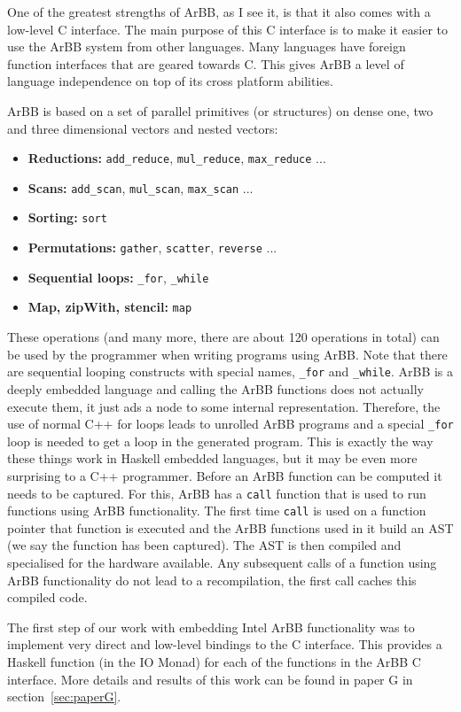 \documentclass[a4paper]{book}
\begin{document}
One of the greatest strengths of ArBB, as I see it, is that it also comes with a low-level C 
interface. The main purpose of this C interface is to make it easier to use the ArBB system 
from other languages. Many languages have foreign function interfaces that are geared towards C.
This gives ArBB a level of language independence on top of its cross platform abilities.  


ArBB is based on a set of parallel primitives (or structures) on dense one, two and three dimensional vectors and nested vectors: 
\begin{itemize} 
\item {\bf Reductions:}   {\tt add\_reduce}, {\tt mul\_reduce}, {\tt max\_reduce} ... 
\item {\bf Scans:}        {\tt add\_scan}, {\tt mul\_scan}, {\tt max\_scan} ... 
\item {\bf Sorting:}      {\tt sort} 
\item {\bf Permutations:} {\tt gather}, {\tt scatter}, {\tt reverse} ...
\item {\bf Sequential loops:} {\tt \_for}, {\tt \_while} 
\item {\bf Map, zipWith, stencil:}  {\tt map} 
\end{itemize}

These operations (and many more, there are about 120 operations in total) can be used 
by the programmer when writing programs using ArBB. Note that there are sequential looping 
constructs with special names, {\tt \_for} and {\tt \_while}. ArBB is a deeply embedded 
language and calling the ArBB functions does not actually execute them, it just ads a node to 
some internal representation. Therefore, the use of normal C++ for loops leads to unrolled 
ArBB programs and a special {\tt \_for} loop is needed to get a loop in the generated program. 
This is exactly the way these things work in Haskell embedded languages, but it may be even 
more surprising to a C++ programmer. Before an ArBB function can be computed it needs to be 
captured. For this, ArBB has a {\tt call} function that is used to run functions using ArBB 
functionality. The first time {\tt call} is used on a function pointer that function is 
executed and the ArBB functions used in it build an AST (we say the function has been 
captured). The AST is then compiled and specialised for the hardware available. Any 
subsequent calls of a function using ArBB functionality do not lead to a recompilation, 
the first call caches this compiled code. 

The first step of our work with embedding Intel ArBB functionality was to implement very direct 
and low-level bindings to the C interface. This provides a Haskell function (in the IO Monad) 
for each of the functions in the ArBB C interface. More details and results of this work 
can be found in paper G in section~\ref{sec:paperG}.
\end{document}
